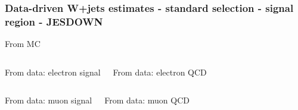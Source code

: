 \documentclass[red,compress,xcolor=table]{beamer}
\begin{document}
\begin{frame}
  \frametitle{Data-driven W+jets estimates - standard selection - signal region - JESDOWN}

\vspace*{-0.5cm}
\begin{block}{\scriptsize From MC}
\begin{center}
    {\tiny
      
    }
\end{center}
  \end{block}

\vspace*{-0.2cm}
\begin{columns}
  \begin{block}{\scriptsize From data: electron signal}
    {\tiny
      
    }
  \end{block}
  \begin{block}{\scriptsize From data: electron QCD}
    {\tiny
      
    }
  \end{block}
\end{columns}
\begin{columns}
  \begin{block}{\scriptsize From data: muon signal}
    {\tiny
      
    }
  \end{block}
  \begin{block}{\scriptsize From data: muon QCD}
    {\tiny
      
    }
  \end{block}
\end{columns}


\end{frame}
\end{document}
